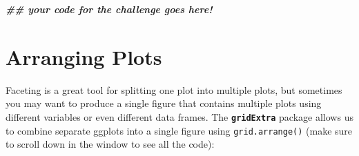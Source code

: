 \documentclass[
  10pt,
  letterpaper,
  twoside,
  openright]{book}
\newenvironment{Shaded}{\begin{snugshade}}{\end{snugshade}}
\newcommand{\DocumentationTok}[1]{\textcolor[rgb]{0.56,0.35,0.01}{\textbf{\textit{#1}}}}
\begin{document}
\begin{Shaded}
\begin{Highlighting}[]
\DocumentationTok{\#\# your code for the challenge goes here!}
\end{Highlighting}
\end{Shaded}

\hypertarget{arranging-plots}{%
\section{Arranging Plots}\label{arranging-plots}}

Faceting is a great tool for splitting one plot into multiple plots, but
sometimes you may want to produce a single figure that contains multiple
plots using different variables or even different data frames. The
\textbf{\texttt{gridExtra}} package allows us to combine separate
ggplots into a single figure using \texttt{grid.arrange()} (make sure to
scroll down in the window to see all the code):
\end{document}

